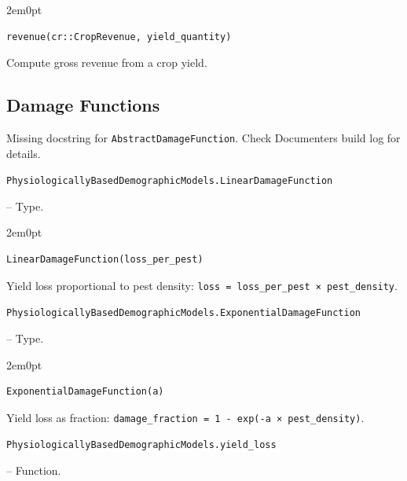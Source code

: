 \begin{adjustwidth}{2em}{0pt}


\begin{verbatim}
revenue(cr::CropRevenue, yield_quantity)
\end{verbatim}

Compute gross revenue from a crop yield.



\end{adjustwidth}

\subsection{Damage Functions}



\label{13611037141930222722}{}


\begin{tcolorbox}[toptitle=-1mm,bottomtitle=1mm,colback=admonition-warning!50!white,colframe=admonition-warning,title=\textbf{Missing docstring.}]
Missing docstring for \texttt{AbstractDamageFunction}. Check Documenter{\textquotesingle}s build log for details.

\end{tcolorbox}

\hypertarget{10423818792136301053}{\texttt{PhysiologicallyBasedDemographicModels.LinearDamageFunction}}  -- {Type.}

\begin{adjustwidth}{2em}{0pt}


\begin{verbatim}
LinearDamageFunction(loss_per_pest)
\end{verbatim}

Yield loss proportional to pest density: \texttt{loss = loss\_per\_pest × pest\_density}.



\end{adjustwidth}
\hypertarget{5079897243489353715}{\texttt{PhysiologicallyBasedDemographicModels.ExponentialDamageFunction}}  -- {Type.}

\begin{adjustwidth}{2em}{0pt}


\begin{verbatim}
ExponentialDamageFunction(a)
\end{verbatim}

Yield loss as fraction: \texttt{damage\_fraction = 1 - exp(-a × pest\_density)}.



\end{adjustwidth}
\hypertarget{4076170981037476072}{\texttt{PhysiologicallyBasedDemographicModels.yield\_loss}}  -- {Function.}

